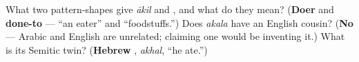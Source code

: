 \begin{tcolorbox}[breakable,colback=teal!4,colframe=teal!35!black,title={Before you move on}]
What two pattern-shapes give \emph{ākil} and \textbf{}, and what do they mean? (\textbf{Doer} and \textbf{done-to} — \textquotedblleft{}an eater\textquotedblright{} and \textquotedblleft{}foodstuffs.\textquotedblright{}) Does \emph{akala} have an English cousin? (\textbf{No} — Arabic and English are unrelated; claiming one would be inventing it.) What is its Semitic twin? (\textbf{Hebrew }, \emph{akhal}, \textquotedblleft{}he ate.\textquotedblright{})
\end{tcolorbox}
